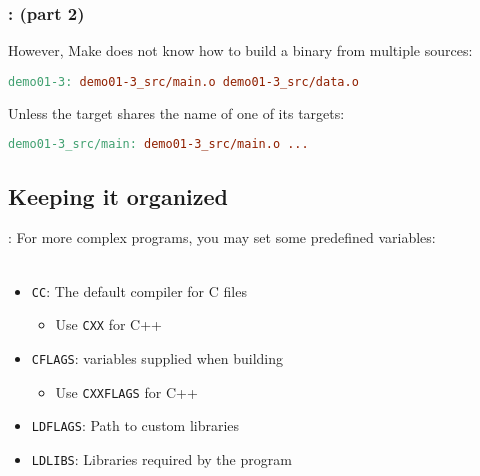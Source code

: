 \begin{frame}[fragile]
    \frametitle{\secname: \small\subsecname (part 2)\normalsize}

    However, Make does not know how to build a binary from multiple sources:

    \small \begin{lstlisting}[language=make]
demo01-3: demo01-3_src/main.o demo01-3_src/data.o
    \end{lstlisting} \normalsize

    Unless the target shares the name of one of its targets:
    \small \begin{lstlisting}[language=make]
demo01-3_src/main: demo01-3_src/main.o ...
    \end{lstlisting} \normalsize
\end{frame}

%
%
%

\subsection{Keeping it organized}
\begin{frame}{\secname: \small\subsecname\normalsize}
    For more complex programs, you may set some predefined
    variables: \\~\\

    \begin{itemize}
        \item \texttt{CC}: The default compiler for C files
        \begin{itemize}
            \item Use \texttt{CXX} for C++
        \end{itemize}
        \item \texttt{CFLAGS}: variables supplied when building
        \begin{itemize}
            \item Use \texttt{CXXFLAGS} for C++
        \end{itemize}
        \item \texttt{LDFLAGS}: Path to custom libraries
        \item \texttt{LDLIBS}: Libraries required by the program
    \end{itemize}
\end{frame}

